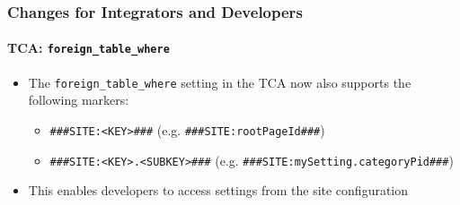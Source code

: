 %

\begin{frame}[fragile]
	\frametitle{Changes for Integrators and Developers}
	\framesubtitle{TCA: \texttt{foreign\_table\_where}}


	\begin{itemize}
		\item The \texttt{foreign\_table\_where} setting in the TCA now also
			supports the following markers:

			\begin{itemize}
				\item \texttt{\#\#\#SITE:<KEY>\#\#\#}\newline
					(e.g. \texttt{\#\#\#SITE:rootPageId\#\#\#})
				\item \texttt{\#\#\#SITE:<KEY>.<SUBKEY>\#\#\#}\newline
					(e.g. \texttt{\#\#\#SITE:mySetting.categoryPid\#\#\#})
			\end{itemize}

		\item This enables developers to access settings from the site configuration

	\end{itemize}
\end{frame}

